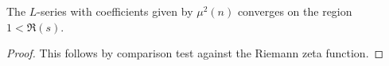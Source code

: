 \begin{theorem}
\label{LSeriesSummable_moebius_sq}
\leanok
The $L$-series with coefficients given by $\mu^2(n)$ converges on the region $1<\Re(s)$.
\end{theorem}
\begin{proof}
\leanok
This follows by comparison test against the Riemann zeta function.
\end{proof}
